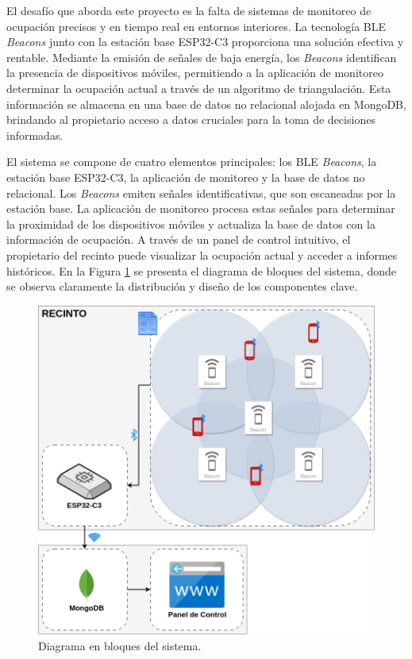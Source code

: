 \documentclass[
11pt, %
]{charter}
\begin{document}
El desafío que aborda este proyecto es la falta de sistemas de monitoreo de ocupación precisos y en tiempo real en entornos interiores. La tecnología BLE \textit{Beacons} junto con la estación base ESP32-C3 proporciona una solución efectiva y rentable. Mediante la emisión de señales de baja energía, los \textit{Beacons} identifican la presencia de dispositivos móviles, permitiendo a la aplicación de monitoreo determinar la ocupación actual a través de un algoritmo de triangulación. Esta información se almacena en una base de datos no relacional alojada en MongoDB, brindando al propietario acceso a datos cruciales para la toma de decisiones informadas.

El sistema se compone de cuatro elementos principales: los BLE \textit{Beacons}, la estación base ESP32-C3, la aplicación de monitoreo y la base de datos no relacional. Los \textit{Beacons} emiten señales identificativas, que son escaneadas por la estación base. La aplicación de monitoreo procesa estas señales para determinar la proximidad de los dispositivos móviles y actualiza la base de datos con la información de ocupación. A través de un panel de control intuitivo, el propietario del recinto puede visualizar la ocupación actual y acceder a informes históricos. En la Figura \ref{fig:diagBloques} se presenta el diagrama de bloques del sistema, donde se observa claramente la distribución y diseño de los componentes clave.

\begin{figure}[htpb]
\centering 
\includegraphics[width=.7\textwidth]{./Figuras/diagBloques.png}
\caption{Diagrama en bloques del sistema.}
\label{fig:diagBloques}
\end{figure}
\end{document}
